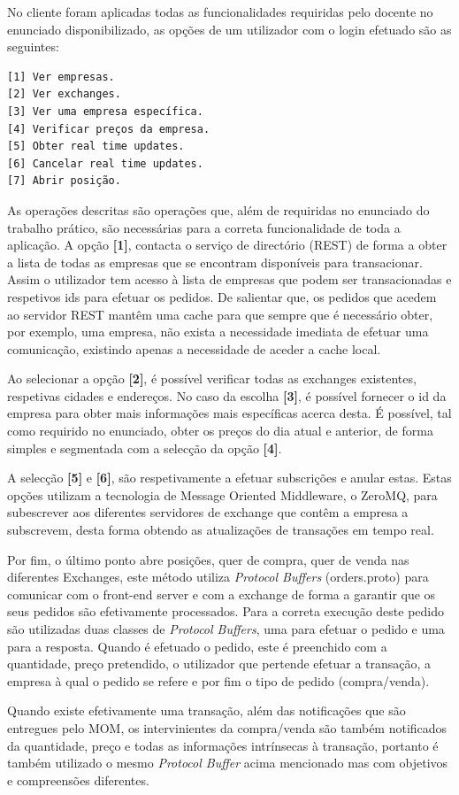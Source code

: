 \documentclass[a4paper,12pt]{article}
\begin{document}
\par No cliente foram aplicadas todas as funcionalidades requiridas pelo docente no enunciado disponibilizado, as opções de um utilizador com o login efetuado são as seguintes:
\begin{verbatim}
[1] Ver empresas.
[2] Ver exchanges.
[3] Ver uma empresa específica.
[4] Verificar preços da empresa.
[5] Obter real time updates.
[6] Cancelar real time updates.
[7] Abrir posição.
\end{verbatim}
\par As operações descritas são operações que, além de requiridas no enunciado do trabalho prático, são necessárias para a correta funcionalidade de toda a aplicação. A opção \textbf{[1]}, contacta o serviço de directório (REST) de forma a obter a lista de todas as empresas que se encontram disponíveis para transacionar. Assim o utilizador tem acesso à lista de empresas que podem ser transacionadas e respetivos ids para efetuar os pedidos. De salientar que, os pedidos que acedem ao servidor REST mantêm uma cache para que sempre que é necessário obter, por exemplo, uma empresa, não exista a necessidade imediata de efetuar uma comunicação, existindo apenas a necessidade de aceder a cache local.
\par Ao selecionar a opção \textbf{[2]}, é possível verificar todas as exchanges existentes, respetivas cidades e endereços. No caso da escolha \textbf{[3]}, é possível fornecer o id da empresa para obter mais informações mais específicas acerca desta. É possível, tal como requirido no enunciado, obter os preços do dia atual e anterior, de forma simples e segmentada com a selecção da opção \textbf{[4]}.
\par A selecção \textbf{[5]} e \textbf{[6]}, são respetivamente a efetuar subscrições e anular estas. Estas opções utilizam a tecnologia de Message Oriented Middleware, o ZeroMQ, para subescrever aos diferentes servidores de exchange que contêm a empresa a subscrevem, desta forma obtendo as atualizações de transações em tempo real.
\par Por fim, o último ponto abre posições, quer de compra, quer de venda nas diferentes Exchanges, este método utiliza \textit{Protocol Buffers} (orders.proto) para comunicar com o front-end server e com a exchange de forma a garantir que os seus pedidos são efetivamente processados. Para a correta execução deste pedido são utilizadas duas classes de \textit{Protocol Buffers}, uma para efetuar o pedido e uma para a resposta. Quando é efetuado o pedido, este é preenchido com a quantidade, preço pretendido, o utilizador que pertende efetuar a transação, a empresa à qual o pedido se refere e por fim o tipo de pedido (compra/venda).
\par Quando existe efetivamente uma transação, além das notificações que são entregues pelo MOM, os intervinientes da compra/venda são também notificados da quantidade, preço e todas as informações intrínsecas à transação, portanto é também utilizado o mesmo \textit{Protocol Buffer} acima mencionado mas com objetivos e compreensões diferentes.
\end{document}
